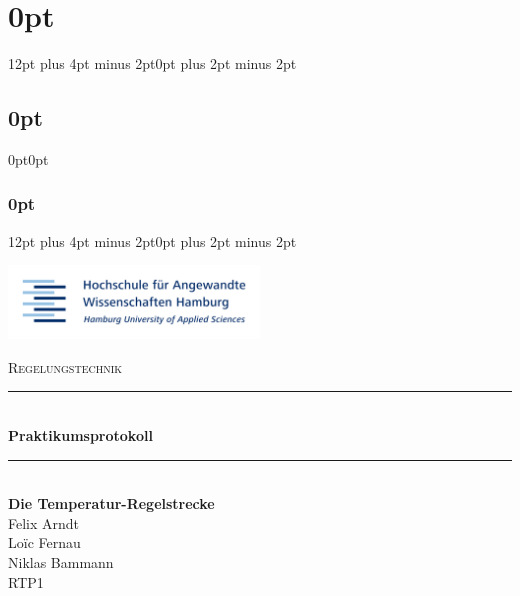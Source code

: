 
\lhead{}
\rhead{}



\usepackage{titlesec}
\titlespacing\section{0pt}{12pt plus 4pt minus 2pt}{0pt plus 2pt minus 2pt}
\titlespacing\subsection{0pt}{0pt}{0pt}
\titlespacing\subsubsection{0pt}{12pt plus 4pt minus 2pt}{0pt plus 2pt minus 2pt}



	

 	\begin{titlepage}
 		\begin{flushright}
			\includegraphics[width=0.5\textwidth]{img/title.png}\\[2cm]
		\end{flushright}
		
		\begin{center}
			\textsc{\Large Regelungstechnik}
			\rule{\linewidth}{0.5mm}\\[1.5cm]
			{ \huge \bfseries Praktikumsprotokoll}
			\rule{\linewidth}{0.5mm}\\[2cm]
			{ \huge \bfseries Die Temperatur-Regelstrecke}\\[2cm]
            
            \LARGE Felix Arndt \\
			\LARGE Loïc Fernau \\
			\LARGE Niklas Bammann \\[4cm]
			\large RTP1
		\end{center}
	\end{titlepage}
	\newpage
	
